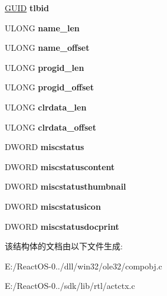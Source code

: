 \begin{DoxyCompactItemize}
\mbox{\label{structcomclassredirect__data_a8446a8330ccba173ba5679d90c52daf0}} 
\hyperlink{interface_g_u_i_d}{G\+U\+ID} {\bfseries tlbid}
\item 
\mbox{\label{structcomclassredirect__data_a151a75a93ee4676f2857ee318bad1525}} 
U\+L\+O\+NG {\bfseries name\+\_\+len}
\item 
\mbox{\label{structcomclassredirect__data_a25b39e0f7b8981a25ce8faf0e74a5006}} 
U\+L\+O\+NG {\bfseries name\+\_\+offset}
\item 
\mbox{\label{structcomclassredirect__data_aaf4a09c9f5fa9496e5f89f2dcf22b1ff}} 
U\+L\+O\+NG {\bfseries progid\+\_\+len}
\item 
\mbox{\label{structcomclassredirect__data_a32672f2d34c3b43296947f039a1891d1}} 
U\+L\+O\+NG {\bfseries progid\+\_\+offset}
\item 
\mbox{\label{structcomclassredirect__data_a483bf8e660dc1f9605a2bff9bd655724}} 
U\+L\+O\+NG {\bfseries clrdata\+\_\+len}
\item 
\mbox{\label{structcomclassredirect__data_a4b5cb0f6720255a5f756ad384c62009a}} 
U\+L\+O\+NG {\bfseries clrdata\+\_\+offset}
\item 
\mbox{\label{structcomclassredirect__data_a1620c2c4ba256307a9d4c5095407dda4}} 
D\+W\+O\+RD {\bfseries miscstatus}
\item 
\mbox{\label{structcomclassredirect__data_ab3403d245ddcafe72a33db54d78c1b92}} 
D\+W\+O\+RD {\bfseries miscstatuscontent}
\item 
\mbox{\label{structcomclassredirect__data_af910e50fa0e2116f2ebba7a8995e6f8f}} 
D\+W\+O\+RD {\bfseries miscstatusthumbnail}
\item 
\mbox{\label{structcomclassredirect__data_a53201e717405e2b3c820ab9ba4551066}} 
D\+W\+O\+RD {\bfseries miscstatusicon}
\item 
\mbox{\label{structcomclassredirect__data_aba108d3ac024e4ee9c6959d133fd931a}} 
D\+W\+O\+RD {\bfseries miscstatusdocprint}
\end{DoxyCompactItemize}


该结构体的文档由以下文件生成\+:\begin{DoxyCompactItemize}
\item 
E\+:/\+React\+O\+S-\/0../dll/win32/ole32/compobj.\+c\item 
E\+:/\+React\+O\+S-\/0../sdk/lib/rtl/actctx.\+c\end{DoxyCompactItemize}
